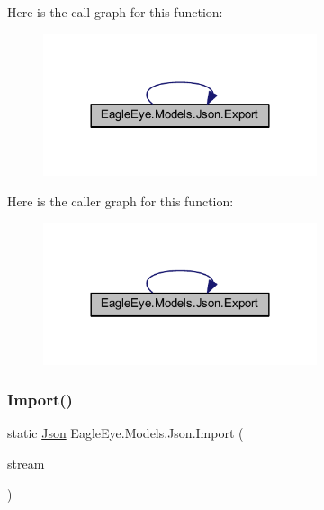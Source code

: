 Here is the call graph for this function\+:\nopagebreak
\begin{figure}[H]
\begin{center}
\leavevmode
\includegraphics[width=228pt]{class_eagle_eye_1_1_models_1_1_json_ad911e1ca9e6ba8a8ae4c85152593c691_cgraph}
\end{center}
\end{figure}
Here is the caller graph for this function\+:\nopagebreak
\begin{figure}[H]
\begin{center}
\leavevmode
\includegraphics[width=228pt]{class_eagle_eye_1_1_models_1_1_json_ad911e1ca9e6ba8a8ae4c85152593c691_icgraph}
\end{center}
\end{figure}
\mbox{\label{class_eagle_eye_1_1_models_1_1_json_ae79a899679f529bfebb18683afd1c9d1}} 
\subsubsection{\texorpdfstring{Import()}{Import()}}
{\footnotesize\ttfamily static \mbox{\hyperlink{class_eagle_eye_1_1_models_1_1_json}{Json}} Eagle\+Eye.\+Models.\+Json.\+Import (\begin{DoxyParamCaption}\item[{Stream\+Reader}]{stream }\end{DoxyParamCaption})\hspace{0.3cm}{\ttfamily [static]}}





